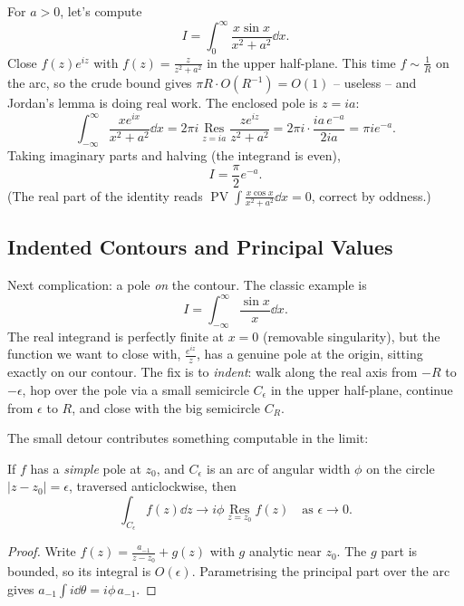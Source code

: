 \documentclass[a4paper]{scrartcl}
\newcommand{\Res}{\operatorname*{Res}}
\newcommand{\pv}{\operatorname{PV}}
\begin{document}
\begin{example}
	For $a > 0$, let's compute
	$$
	I = \int_0^\infty \frac{x \sin x}{x^2 + a^2} \dd x.
	$$
	Close $f(z) e^{iz}$ with $f(z) = \frac{z}{z^2 + a^2}$ in the upper half-plane. This time $f \sim \frac 1R$ on the arc, so the crude bound gives $\pi R \cdot O(R^{-1}) = O(1)$ -- useless -- and Jordan's lemma is doing real work. The enclosed pole is $z = ia$:
	$$
	\int_{-\infty}^\infty \frac{x e^{ix}}{x^2 + a^2} \dd x = 2\pi i \Res_{z = ia} \frac{z e^{iz}}{z^2 + a^2} = 2\pi i \cdot \frac{ia \, e^{-a}}{2ia} = \pi i e^{-a}.
	$$
	Taking imaginary parts and halving (the integrand is even),
	$$
	I = \frac{\pi}{2} e^{-a}.
	$$
	(The real part of the identity reads $\pv\int \frac{x\cos x}{x^2 + a^2} \dd x = 0$, correct by oddness.)
\end{example}

\subsection{Indented Contours and Principal Values}

Next complication: a pole \emph{on} the contour. The classic example is
$$
I = \int_{-\infty}^\infty \frac{\sin x}{x} \dd x.
$$
The real integrand is perfectly finite at $x = 0$ (removable singularity), but the function we want to close with, $\frac{e^{iz}}{z}$, has a genuine pole at the origin, sitting exactly on our contour. The fix is to \emph{indent}: walk along the real axis from $-R$ to $-\epsilon$, hop over the pole via a small semicircle $C_\epsilon$ in the upper half-plane, continue from $\epsilon$ to $R$, and close with the big semicircle $C_R$.

\begin{center}
\end{center}

The small detour contributes something computable in the limit:

\begin{lemma}
	If $f$ has a \emph{simple} pole at $z_0$, and $C_\epsilon$ is an arc of angular width $\phi$ on the circle $|z - z_0| = \epsilon$, traversed anticlockwise, then
	$$
	\int_{C_\epsilon} f(z) \dd z \to i \phi \Res_{z = z_0} f(z) \quad \text{as } \epsilon \to 0.
	$$
\end{lemma}
\begin{proof}
	Write $f(z) = \frac{a_{-1}}{z - z_0} + g(z)$ with $g$ analytic near $z_0$. The $g$ part is bounded, so its integral is $O(\epsilon)$. Parametrising the principal part over the arc gives $a_{-1} \int i \dd\theta = i\phi \, a_{-1}$.
\end{proof}
\end{document}
